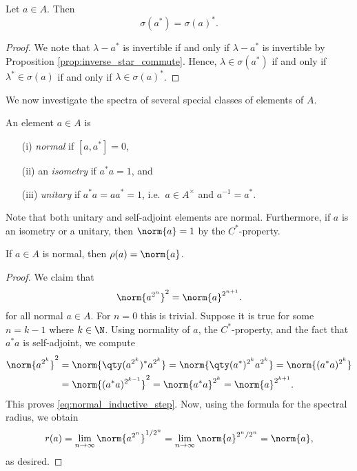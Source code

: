 \begin{proposition}\label{prop:star_spectrum}
Let $a \in A$. Then
\begin{equation}
\sigma(a^*) = \sigma(a)^*.
\end{equation}
\end{proposition}

\begin{proof}
We note that $\lambda - a^*$ is invertible if and only if $\lambda - a^*$ is invertible by Proposition \ref{prop:inverse_star_commute}. Hence, $\lambda \in \sigma(a^*)$ if and only if $\lambda^* \in \sigma(a)$ if and only if $\lambda \in \sigma(a)^*$.
\end{proof}

We now investigate the spectra of several special classes of elements of $A$.

\begin{definition}
An element $a \in A$ is 
\begin{enumerate}
	\item[(i)] \emph{normal} if $[a,a^*] = 0$,
	\item[(ii)] an \emph{isometry} if $a^*a = 1$, and
	\item[(iii)] \emph{unitary} if $a^*a = aa^* = 1$, i.e.\ $a \in A^\times$ and $a^{-1} = a^*$.
\end{enumerate}
Note that both unitary and self-adjoint elements are normal. Furthermore, if $a$ is an isometry or a unitary, then $\norm{a} = 1$ by the $C^*$-property. 
\end{definition}


\begin{corollary}
If $a \in A$ is normal, then $\rho(a) = \norm{a}$.
\end{corollary}

\begin{proof}
We claim that
\begin{equation}\label{eq:normal_inductive_step}
\norm{a^{2^n}}^2 = \norm{a}^{2^{n+1}}.
\end{equation}
for all normal $a \in A$. For $n = 0$ this is trivial. Suppose it is true for some $n = k-1$ where $k \in \N$. Using normality of $a$, the $C^*$-property, and the fact that $a^*a$ is self-adjoint, we compute
\begin{equation}
\begin{aligned}
\norm{a^{2^k}}^2  &= \norm{\qty(a^{2^k})^*a^{2^k}} = \norm{\qty(a^*)^{2^k}a^{2^k}} = \norm{(a^*a)^{2^k}} \\
&= \norm{(a^*a)^{2^{k-1}}}^2  = \norm{a^*a}^{2^k} = \norm{a}^{2^{k+1}}.
\end{aligned}
\end{equation}
This proves \eqref{eq:normal_inductive_step}. Now, using the formula for the spectral radius, we obtain
\begin{equation}
r(a) = \lim_{n \rightarrow \infty} \norm{a^{2^n}}^{1/2^n} = \lim_{n \rightarrow \infty} \norm{a}^{2^{n}/2^n} = \norm{a},
\end{equation}
as desired.
\end{proof}

